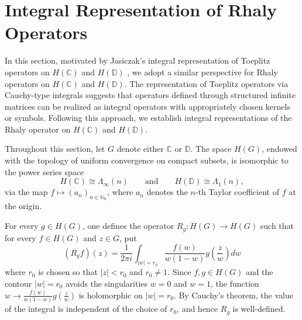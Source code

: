 \documentclass{birkjour}
\theoremstyle{definition}
\theoremstyle{remark}
\numberwithin{equation}{section}
\begin{document}
\section{Integral Representation of Rhaly Operators} 

In this section, motivated by Jasiczak's integral representation of Toeplitz operators on 
$H(\mathbb{C})$ and $H(\mathbb{D})$ \cite{J1,J2}, we adopt a similar perspective for Rhaly operators on $H(\mathbb{C})$ and $H(\mathbb{D})$. The representation of Toeplitz operators via Cauchy-type integrals 
suggests that operators defined through structured infinite matrices can be realized as integral operators with appropriately chosen kernels or symbols. 
Following this approach, we establish integral representations of the Rhaly 
operator on $H(\mathbb{C})$ and $H(\mathbb{D})$.


Throughout this section, let $G$ denote either $\mathbb{C}$ or $\mathbb{D}$. The space $H(G)$, 
endowed with the topology of uniform convergence on compact subsets, 
is isomorphic to the power series space
$$H(\mathbb{C})\cong\Lambda_{\infty}(n) \qquad \text{and} \qquad 
H(\mathbb{D})\cong\Lambda_{1}(n),$$
via the map $f\mapsto (a_n)_{n\in\mathbb{N}_0}$, where $a_n$ denotes 
the $n$-th Taylor coefficient of $f$ at the origin.

For every $g\in H(G)$, one defines the operator $R_{g}:H(G) \to H(G)$ such that for every $f\in H(G)$ and $z\in G$, put
\begin{equation}
(R_{g}f)(z)=\frac{1}{2\pi i}\int_{|w|=r_{0}} \frac{f(w)}{w(1-w)}g\left(\frac{z}{w}\right)dw
\end{equation}
where $r_{0}$ is chosen so that $|z|<r_{0}$ and $r_{0}\neq 1$. Since $f,g\in H(G)$ and the contour $|w|=r_{0}$ avoids the singularities 
$w=0$ and $w=1$, the function $\displaystyle w\to \frac{f(w)}{w(1-w)}g\left(\frac{z}{w}\right)$ is holomorphic on $|w|=r_{0}$. By Cauchy's 
theorem, the value of the integral is independent of the choice of $r_{0}$, 
and hence $R_g$ is well-defined.
\end{document}
